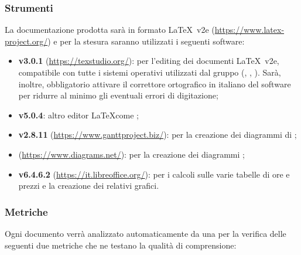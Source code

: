 	\subsubsection{Strumenti}
	La documentazione prodotta sarà in formato \LaTeX\ v2e (\url{https://www.latex-project.org/}) e per la stesura saranno utilizzati i seguenti software:
	\begin{itemize}
		\item \textbf{ v3.0.1} (\url{https://texstudio.org/}): per l'editing dei documenti \LaTeX\ v2e, compatibile con tutte i sistemi operativi utilizzati dal gruppo (, , ). Sarà, inoltre, obbligatorio attivare il correttore ortografico in italiano del software per ridurre al minimo gli eventuali errori di digitazione;
		\item \textbf{ v5.0.4}: altro editor \LaTeX come ;
		\item \textbf{ v2.8.11} (\url{https://www.ganttproject.biz/}): per la creazione dei diagrammi di ;
		\item \textbf{} (\url{https://www.diagrams.net/}): per la creazione dei diagrammi ;
		\item \textbf{ v6.4.6.2} (\url{https://it.libreoffice.org/}): per i calcoli sulle varie tabelle di ore  e prezzi e la creazione dei relativi grafici.
	\end{itemize}

	\subsubsection{Metriche}
	Ogni documento verrà analizzato automaticamente da una  per la verifica delle seguenti due metriche che ne testano la qualità di comprensione:

